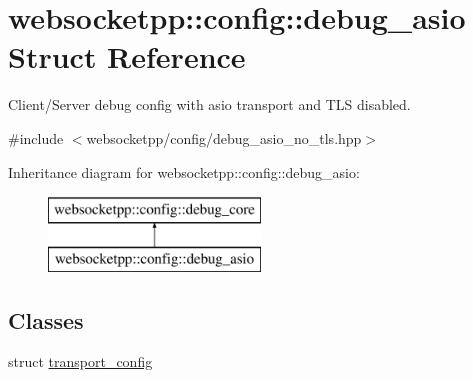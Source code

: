 \hypertarget{structwebsocketpp_1_1config_1_1debug__asio}{}\section{websocketpp\+:\+:config\+:\+:debug\+\_\+asio Struct Reference}
\label{structwebsocketpp_1_1config_1_1debug__asio}


Client/\+Server debug config with asio transport and T\+L\+S disabled.  




{\ttfamily \#include $<$websocketpp/config/debug\+\_\+asio\+\_\+no\+\_\+tls.\+hpp$>$}

Inheritance diagram for websocketpp\+:\+:config\+:\+:debug\+\_\+asio\+:\begin{figure}[H]
\begin{center}
\leavevmode
\includegraphics[height=2.000000cm]{structwebsocketpp_1_1config_1_1debug__asio}
\end{center}
\end{figure}
\subsection*{Classes}
\begin{DoxyCompactItemize}
\item 
struct \hyperlink{structwebsocketpp_1_1config_1_1debug__asio_1_1transport__config}{transport\+\_\+config}
\end{DoxyCompactItemize}
